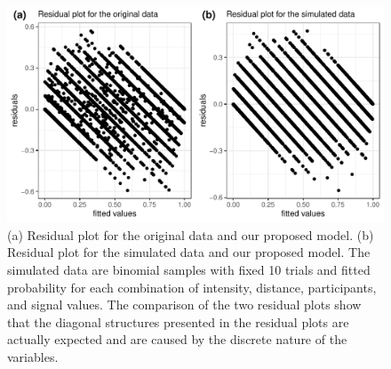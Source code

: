 \begin{knitrout}
\color{fgcolor}\begin{figure}
\includegraphics[width=\linewidth]{figure/residuals-1} \caption[(a) Residual plot for the original data and our proposed model]{(a) Residual plot for the original data and our proposed model. (b) Residual plot for the simulated data and our proposed model. The simulated data are binomial samples with fixed 10 trials and fitted probability for each combination of intensity, distance, participants, and signal values. The comparison of the two residual plots show that the diagonal structures presented in the residual plots are actually expected and are caused by the discrete nature of the variables.}\label{fig:residuals}
\end{figure}

\end{knitrout}



